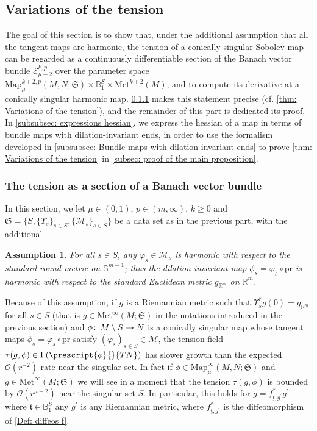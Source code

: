\documentclass{article}
\numberwithin{equation}{section}        %
\theoremstyle{bfnote}
\newtheorem{hyp}[thm]{Assumption}           %
\theoremstyle{definition}
\theoremstyle{bfremark}
\newcommand{\col}{\colon \thinspace}        %
\newcommand{\R}{\mathbb{R}}                 %
\newcommand{\Ball}{\mathbb{B}}              %
\newcommand{\Sp}{\mathbb{S}}                %
\newcommand{\Map}{\mathrm{Map}}             %
\newcommand{\Met}{\mathrm{Met}}             %
\newcommand{\pr}{\mathrm{pr}}               %
\begin{document}
    \subsection{Variations of the tension}      \label{subsec: variations of the tension}

The goal of this section is to show that, under the additional assumption that all the tangent maps are harmonic, the tension of a conically singular Sobolev map can be regarded as a continuously differentiable section of the Banach vector bundle $\mathcal{E}^{k,p}_{\mu-2}$ over the parameter space $\Map^{k+2,p}_{\mu}(M,N;\mathfrak{S}) \times \Ball_1^S \times \Met^{k+2}(M)$, and to compute its derivative at a conically singular harmonic map. \cref{subsubsec: tension as section} makes this statement precise (cf. \cref{thm: Variations of the tension}), and the remainder of this part is dedicated its proof. In \cref{subsubsec: expressions hessian}, we express the hessian of a map in terms of bundle maps with dilation-invariant ends, in order to use the formalism developed in \cref{subsubsec: Bundle maps with dilation-invariant ends} to prove \cref{thm: Variations of the tension} in \cref{subsec: proof of the main proposition}. 


    \subsubsection{The tension as a section of a Banach vector bundle}      \label{subsubsec: tension as section}

In this section, we let $\mu \in (0,1)$, $p \in (m,\infty)$, $k \geq 0$ and $\mathfrak{S} = \{S,\{\Upsilon_s\}_{s \in S}, \{\mathcal{M}_s\}_{s \in S}\}$ be a data set as in the previous part, with the additional
\begin{hyp}
    For all $s \in S$, any $\varphi_s \in \mathcal{M}_s$ is harmonic with respect to the standard round metric on $\Sp^{m-1}$; thus the dilation-invariant map $\phi_s = \varphi_s \circ \pr$ is harmonic with respect to the standard Euclidean metric $g_{\R^m}$ on $\R^m$.
\end{hyp}
Because of this assumption, if $g$ is a Riemannian metric such that $\Upsilon_s^* g(0) = g_{\R^m}$ for all $s \in S$ (that is $g \in \Met^\infty(M;\mathfrak{S})$ in the notations introduced in the previous section) and $\phi \col M \setminus S \to N$ is a conically singular map whose tangent maps $\phi_s = \varphi_s \circ \pr$ satisfy $(\varphi_s)_{s \in S} \in \mathcal{M}$, the tension field $\tau(g,\phi) \in \Gamma(\prescript{\phi}{}{TN})$ has slower growth than the expected $\mathcal{O}(r^{-2})$ rate near the singular set. In fact if $\phi \in \Map^\infty_\mu(M,N;\mathfrak{S})$ and $g \in \Met^\infty(M;\mathfrak{S})$ we will see in a moment that the tension $\tau(g,\phi)$ is bounded by $\mathcal{O}(r^{\mu-2})$ near the singular set $S$. In particular, this holds for $g = f^*_{\underline{\mathfrak{t}},g^\prime} g^\prime$ where $\underline{\mathfrak{t}} \in \Ball_1^S$ any $g^\prime$ is any Riemannian metric, where $f^*_{\underline{\mathfrak{t}},g^\prime}$ is the diffeomorphism of \cref{Def: diffeos f}. 
\end{document}
